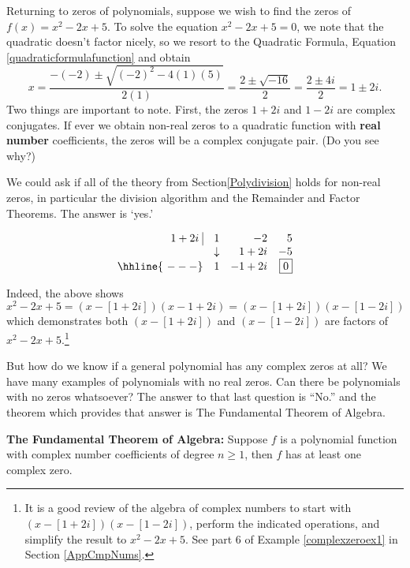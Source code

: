 \documentclass{ximera}
\begin{document}
Returning to zeros of polynomials, suppose we wish to find the zeros of $f(x) = x^2-2x+5$.  To solve the equation $x^2-2x+5 = 0$, we note that the quadratic doesn't factor nicely, so we resort to the Quadratic Formula, Equation \ref{quadraticformulafunction} and obtain \[ x = \dfrac{-(-2) \pm \sqrt{(-2)^2-4(1)(5)}}{2(1)} = \dfrac{2 \pm \sqrt{-16}}{2} = \dfrac{2 \pm 4i}{2} = 1 \pm 2i.\] Two things are important to note.  First, the zeros $1+2i$ and $1-2i$ are complex conjugates.  If ever we obtain non-real zeros to a quadratic function with \textbf{real number} coefficients, the zeros  will be a complex conjugate pair. (Do you see why?)  

We could ask if all of the theory from Section\ref{Polydivision} holds for non-real zeros, in particular the division algorithm and the Remainder and Factor Theorems.  The answer is `yes.'  

\[\begin{array}{rrrr}
1+2i \, \, \vline & 1 & -2 & 5 \\

  & \downarrow   &  1+2i  &  -5 \\ \hhline{~---} 
  
  & 1 & -1+2i &  \fbox{$0$}   \\

\end{array}\]


Indeed, the above shows $x^2-2x+5  = (x-[1+2i])(x-1+2i)= (x-[1+2i])(x-[1-2i])$ which demonstrates both  $(x-[1+2i])$ and  $(x-[1-2i])$ are factors of $x^2-2x+5$.\footnote{It is a good review of the algebra of complex numbers to start with  $(x-[1+2i])(x-[1-2i])$, perform the indicated operations, and simplify the result to $x^2-2x+5$.  See part 6 of  Example \ref{complexzeroex1}  in Section  \ref{AppCmpNums}.}


 But how do we know if a general polynomial has any complex zeros at all?  We have many examples of polynomials with no real zeros.  Can there be polynomials with no zeros whatsoever?  The answer to that last question is ``No.'' and the theorem which provides that answer is  The Fundamental Theorem of Algebra.



\colorbox{ResultColor}{\bbm
\begin{thm} \label{ftoa} \textbf{The Fundamental Theorem of Algebra:}  Suppose $f$ is a polynomial function with complex number coefficients of degree $n \geq 1$, then $f$ has at least one complex zero.

\end{thm}
\ebm}
\end{document}
